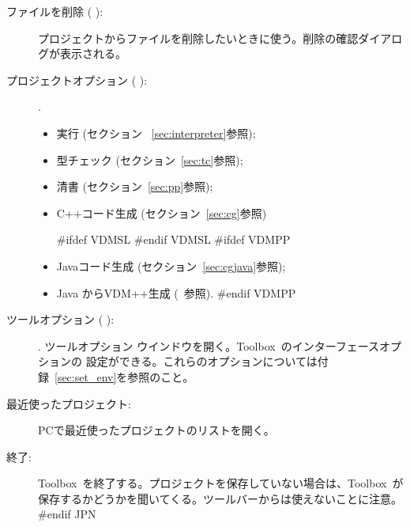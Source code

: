 \documentclass[\pformat,12pt]{article}
\newcommand{\Toolbox}{Toolbox}
\newcommand{\Toolbox}{Toolbox}
\newcommand{\guicmd}[1]{{\sf #1}}
\newcommand{\guicmd}[1]{{\gt #1}}
\begin{document}
\begin{description}
\item[\guicmd{ファイルを削除} (\hspace{-1.5mm}
 ):]
 プロジェクトからファイルを削除したいときに使う。削除の確認ダイアログが表示される。

\item[\guicmd{プロジェクトオプション} (\hspace{-1.5mm}
):].
  \begin{itemize}
    \item \guicmd{実行} (セクション ~\ref{sec:interpreter}参照);
    \item \guicmd{型チェック}  (セクション~\ref{sec:tc}参照);
    \item \guicmd{清書}  (セクション~\ref{sec:pp}参照);
    \item \guicmd{C++コード生成} (セクション~\ref{sec:cg}参照)

#ifdef VDMSL
#endif VDMSL
#ifdef VDMPP
    \item \guicmd{Javaコード生成}  (セクション~\ref{sec:cgjava}参照);
    \item \guicmd{Java からVDM++生成}  (~\cite{Java2VDMMan-SCSK}参照). 
#endif VDMPP
  \end{itemize}

\item[\guicmd{ツールオプション} (\hspace{-1.5mm}
):].
  \guicmd{ツールオプション} ウインドウを開く。\Toolbox\ のインターフェースオプションの
  設定ができる。これらのオプションについては付録~\ref{sec:set_env}を参照のこと。

\item[\guicmd{最近使ったプロジェクト}:]
  PCで最近使ったプロジェクトのリストを開く。

\item[\guicmd{終了}:]
  \Toolbox\ を終了する。プロジェクトを保存していない場合は、\Toolbox\ が
  保存するかどうかを聞いてくる。ツールバーからは使えないことに注意。
#endif JPN

\end{description}
\end{document}
